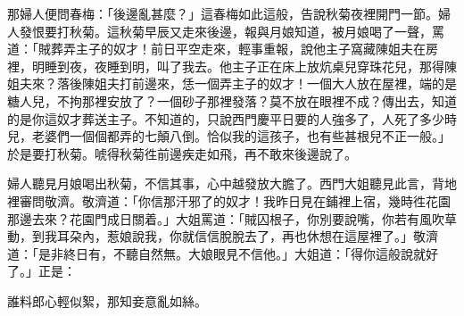 那婦人便問春梅：「後邊亂甚麼？」這春梅如此這般，告說秋菊夜裡開門一節。婦人發恨要打秋菊。這秋菊早辰又走來後邊，報與月娘知道，被月娘喝了一聲，罵道：「賊葬弄主子的奴才！前日平空走來，輕事重報，說他主子窩藏陳姐夫在房裡，明睡到夜，夜睡到明，叫了我去。他主子正在床上放炕桌兒穿珠花兒，那得陳姐夫來？落後陳姐夫打前邊來，恁一個弄主子的奴才！一個大人放在屋裡，端的是糖人兒，不拘那裡安放了？一個砂子那裡發落？莫不放在眼裡不成？傳出去，知道的是你這奴才葬送主子。不知道的，只說西門慶平日要的人強多了，人死了多少時兒，老婆們一個個都弄的七顛八倒。恰似我的這孩子，也有些甚根兒不正一般。」{}於是要打秋菊。唬得秋菊徃前邊疾走如飛，再不敢來後邊說了。

婦人聽見月娘喝出秋菊，不信其事，心中越發放大膽了。{}西門大姐聽見此言，背地裡審問敬濟。敬濟道：「你信那汗邪了的奴才！我昨日見在鋪裡上宿，幾時徃花園那邊去來？花園門成日關着。」大姐罵道：「賊囚根子，你別要說嘴，你若有風吹草動，到我耳朶內，惹娘說我，你就信信脫脫去了，再也休想在這屋裡了。」敬濟道：「是非終日有，不聽自然無。大娘眼見不信他。」{}大姐道：「得你這般說就好了。」正是：

\begin{myquote}
誰料郎心輕似絮，那知妾意亂如絲。
\end{myquote}

